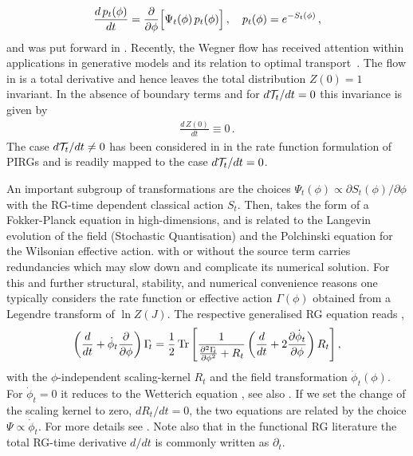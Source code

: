 \documentclass[reprint,amsmath,amssymb,aps,pra,superscriptaddress,nofootinbib,twocolumn,floatfix,nolongbibliography]{revtex4-2}
\begin{document}
%
\begin{align} 
	\frac{d \,p_t(\phi)}{d t} = \frac{\partial}{\partial\phi }\Bigl[ \Psi_t(\phi) \, p_t(\phi)\Bigr]\,, \quad p_t(\phi) = e^{-S_t(\phi)} \,, 
\label{eq:Wegner74} 
\end{align} 
%
and was put forward in \cite{Wegner_1974}. Recently, the Wegner flow has received attention within applications in generative models and its relation to optimal transport~\cite{Cotler:2022fze, Mate:2023fxa, Cotler:2023lem, Albergo:2025nets, Sheshmani:2025ylv}. The flow in  is a total derivative and hence leaves the total distribution $Z(0)=1$ invariant. In the absence of boundary terms and for $d {\cal T}_t/dt=0$ this invariance is given by 
%
\begin{align} 
\frac{d \,Z(0)}{d t}   \equiv 0\,. 
\label{eq:dtZ0}
\end{align} 
%
The case $d {\cal T}_t/dt \neq 0$ has been considered in \cite{Ihssen:2024ihp} in the rate function formulation of PIRGs and is readily mapped to the case $d {\cal T}_t/dt=0$. 

An important subgroup of transformations are the choices $\Psi_t(\phi) \propto  \partial S_t(\phi)/\partial\phi$ with the 
RG-time dependent classical action $S_t$. Then,  takes the form of a Fokker-Planck equation in high-dimensions, and is related to the Langevin evolution of the field (Stochastic Quantisation) and the Polchinski equation \cite{Polchinski1984} for the Wilsonian effective action.  with or without the source term carries redundancies which may slow down and complicate its numerical solution. For this and further structural, stability, and numerical convenience reasons one typically considers the rate function or effective action $\Gamma(\phi)$ obtained from a Legendre transform of $\ln Z(J)$. The respective generalised RG equation reads \cite{Pawlowski:2005xe}, 
 \begin{align} 
 \left(	\frac{d}{d t}  +\dot\phi_t \frac{\partial}{\partial\phi} \right)\Gamma_{\hspace{-.07cm}t}= \frac12 \Tr  \left[\frac{1}{\frac{\partial^2\Gamma_{\hspace{-.07cm}t}}{\partial\phi^2}+R_t} \left(\frac{d}{d t} +  2 \frac{\partial \dot\phi_t}{\partial\phi}\right)R_t \right], 
 \label{eq:GenRG}
 \end{align}
with the $\phi$-independent scaling-kernel $R_t$ and the field transformation $\dot\phi_t(\phi)$. For $\dot\phi_t=0$ it reduces to the Wetterich equation \cite{Wetterich:1992yh}, see also \cite{Ellwanger:1993mw, Morris:1993qb}. If we set the change of the scaling kernel to zero, $d R_t/dt =0$, the two equations  are related by the choice $\Psi\propto \dot\phi_t$. For more details see \cite{Ihssen:2022xjv, Ihssen:2023nqd, Ihssen:2024ihp}. Note also that in the functional RG literature the total RG-time derivative $d/dt$ is commonly written as $\partial_t$.  
\end{document}
